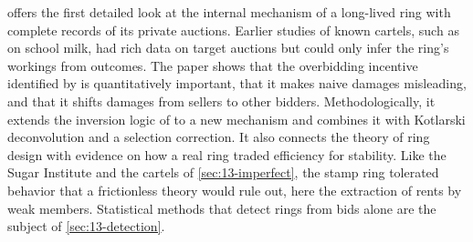 \citet{Asker2010} offers the first detailed look at the internal mechanism of a long-lived ring with complete
records of its private auctions. Earlier studies of known cartels, such as \citet{Pesendorfer2000} on school milk,
had rich data on target auctions but could only infer the ring's workings from outcomes. The paper shows that the
overbidding incentive identified by \citet{GrahamMarshallRichard1990} is quantitatively important, that it makes
naive damages misleading, and that it shifts damages from sellers to other bidders. Methodologically, it extends
the inversion logic of \citet{GuerrePerrigneVuong2000} to a new mechanism and combines it with Kotlarski
deconvolution and a selection correction. It also connects the theory of ring design \citep{GrahamMarshall1987,
MailathZemsky1991, McAfeeMcMillan1992} with evidence on how a real ring traded efficiency for stability. Like the
Sugar Institute and the cartels of \cref{sec:13-imperfect}, the stamp ring tolerated behavior that a frictionless
theory would rule out, here the extraction of rents by weak members. Statistical methods that detect rings from bids
alone are the subject of \cref{sec:13-detection}.
